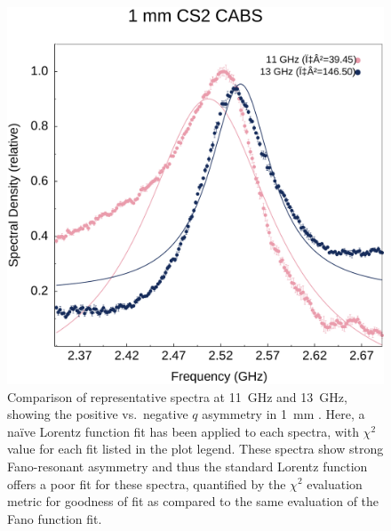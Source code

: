 \begin{figure}[ht]
  \centering
  \includegraphics[width=\textwidth]{figs/4-CABS/CS2LorentzCompare.pdf}
  \caption{Comparison of representative spectra at \SI{11}{\giga\hertz} and \SI{13}{\giga\hertz}, showing the positive vs.\ negative \(q\) asymmetry in \SI{1}{\milli\meter} . Here, a naïve Lorentz function fit has been applied to each spectra, with \(\chi^{2}\) value for each fit listed in the plot legend. These spectra show strong Fano-resonant asymmetry and thus the standard Lorentz function offers a poor fit for these spectra, quantified by the \(\chi^{2}\) evaluation metric for goodness of fit as compared to the same evaluation of the Fano function fit.}
  \label{fig:CS2LorentzCompare}
\end{figure}


